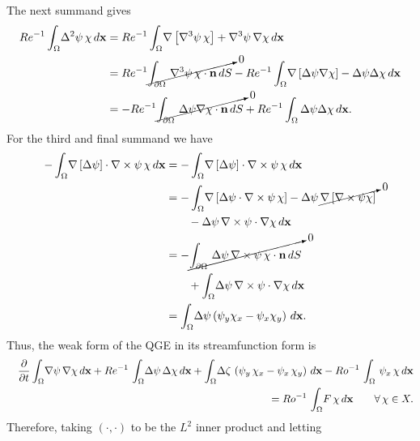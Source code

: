 The next summand gives
\begin{align*}
  Re^{-1}\int_{\Omega}\! \Delta^2 \psi\, \chi \, d\mathbf{x} &= Re^{-1}\int_{\Omega}\! \nabla\left[
    \nabla^3 \psi \, \chi \right] + \nabla^3 \psi\, \nabla \chi \, d\mathbf{x} \\
  &= Re^{-1}\cancelto{0}{\int_{\partial\Omega}\, \nabla^3 \psi\, \chi\cdot \mathbf{n}
    \, dS} - Re^{-1}\int_{\Omega}\! \nabla\left[ \Delta\psi \nabla \chi \right] - \Delta
    \psi \Delta \chi \, d\mathbf{x} \\
  &= -Re^{-1} \cancelto{0}{\int_{\partial\Omega}\, \Delta\psi \nabla \chi \cdot
    \mathbf{n}\, dS} + Re^{-1} \int_{\Omega} \Delta \psi \Delta \chi \,
    d\mathbf{x}.
\end{align*}
For the third and final summand we have
\begin{align*}
  -\int_{\Omega}\! \nabla\left[ \Delta\psi\right]\cdot
    \nabla\times\psi \, \chi \, d\mathbf{x} &= -\int_{\Omega}\!
    \nabla\left[\Delta\psi\right]\cdot \nabla\times\psi \, \chi\, d\mathbf{x}\\
  &= -\int_{\Omega}\! \nabla\left[ \Delta\psi \cdot \nabla\times\psi\, \chi
    \right] -\Delta\psi\, \cancelto{0}{\nabla\left[ \nabla\times\psi \chi
    \right]} \\
      &\qquad - \Delta\psi\, \nabla\times\psi \cdot \nabla\chi \, d\mathbf{x} \\
  &= -\cancelto{0}{\int_{\partial\Omega}\, \Delta\psi \, \nabla\times\psi\, \chi
    \cdot \mathbf{n} \, dS} \\
    &\qquad + \int_{\Omega}\! \Delta \psi \, \nabla\times \psi \cdot
      \nabla \chi \, d\mathbf{x} \\
  &= \int_{\Omega}\! \Delta\psi\left( \psi_y\chi_x - \psi_x\chi_y \right)\, d\mathbf{x}.
\end{align*}
Thus, the weak form of the QGE in its streamfunction form is
\begin{eqnarray}
  && \frac{\partial}{\partial t} \int_{\Omega}\! \nabla \psi\, \nabla \chi  \, d\mathbf{x}
    + Re^{-1} \, \int_{\Omega}\! \Delta \psi \, \Delta \chi \, d{\bf x} + \int_{\Omega}\! \Delta
    \zeta \, \left( \psi_y \, \chi_x - \psi_x \, \chi_y \right)\, d{\bf x} - Ro^{-1} \, \int_{\Omega}
    \, \psi_x \, \chi \, d{\bf x} \nonumber \\
  && \hspace*{3.0cm} = Ro^{-1}\, \int_{\Omega}\! F \, \chi \, d{\bf x} \qquad \forall \, \chi \in X .
\label{eqn:qge_psi_weak}
\end{eqnarray}
Therefore, taking $(\cdot,\cdot)$ to be the $L^2$ inner product and letting
